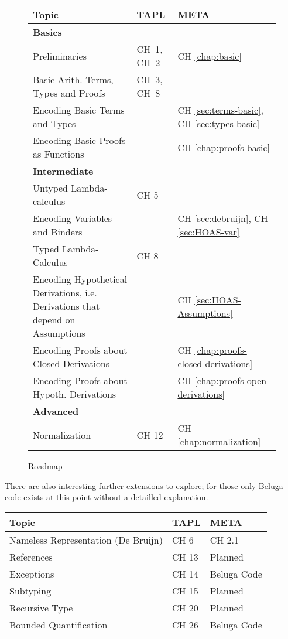 \begin{figure}
  \centering
\begin{tabular}{p{8cm}|p{2.4cm}|p{3.25cm}}
 Topic & TAPL & META \\
\hline  
\textbf{Basics} & & \\\hline\hline
Preliminaries & CH~1, CH~2 & CH \ref{chap:basic}\\
Basic Arith. Terms, Types and Proofs & CH~3, CH~8 &  \\
\hline  
Encoding Basic Terms and Types & & CH \ref{sec:terms-basic}, CH \ref{sec:types-basic} \\
Encoding Basic Proofs as Functions & & CH \ref{chap:proofs-basic} \\
\hline  \hline
\textbf{Intermediate} & & \\\hline \hline
Untyped Lambda-calculus & CH 5  & \\
Encoding Variables and Binders & & CH \ref{sec:debruijn}, CH \ref{sec:HOAS-var} \\
\hline  
Typed Lambda-Calculus & CH 8  & \\
Encoding Hypothetical Derivations, i.e. Derivations that depend on
Assumptions & & CH \ref{sec:HOAS-Assumptions}\\
Encoding Proofs about Closed Derivations & & CH \ref{chap:proofs-closed-derivations} \\
Encoding Proofs about Hypoth. Derivations & & CH \ref{chap:proofs-open-derivations} \\
\hline\hline
\textbf{Advanced} & & \\\hline \hline
Normalization & CH 12 & CH \ref{chap:normalization}\\
\end{tabular} 
  \caption{Roadmap}
  \label{fig:roadmap}
\end{figure}
There are also interesting further extensions to explore; for those only Beluga code exists at this point without a detailled explanation. 

\begin{center}
\begin{tabular}{p{9cm}|p{2.25cm}|p{2.75cm}}
 Topic & TAPL & META \\
\hline    
Nameless Representation (De Bruijn) & CH 6 & CH 2.1 \\  
References & CH 13 & Planned \\
Exceptions & CH 14 & Beluga Code \\
Subtyping & CH 15 & Planned \\
Recursive Type & CH 20 & Planned\\
Bounded Quantification & CH 26 & Beluga Code \\
\end{tabular}
\end{center}




